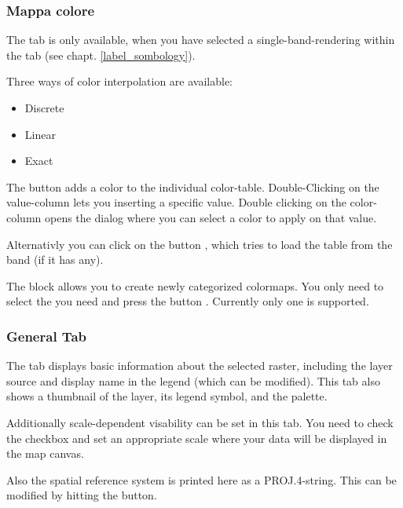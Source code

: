 \subsubsection{Mappa colore} \label{label_colormaptab}

The  tab is only available, when you have selected a
single-band-rendering within the tab  (see chapt. \ref{label_sombology}).

Three ways of color interpolation are available:
\begin{itemize}
\item Discrete
\item Linear 
\item Exact
\end{itemize}

The button  adds a color to the individual color-table.
Double-Clicking on the value-column lets you inserting a specific value.
Double clicking on the color-column opens the dialog  where you can select a color to apply on that value.

Alternativly you can click on the button
, which tries to
load the table from the band (if it has any).

The block  allows you to create newly
categorized colormaps. You only need to select the  you need and press the button . Currently
only one  is
supported.

\subsubsection{General Tab}\label{label_generaltab}

The  tab displays basic information about the selected raster,
including the layer source and  display name in the legend (which can be
modified). This tab also shows a thumbnail of the layer, its legend symbol,
and the palette.

Additionally scale-dependent visability can be set in this tab. You need to
check the checkbox and set an appropriate scale where your data will be
displayed in the map canvas.

Also the spatial reference system is printed here as a PROJ.4-string. 
This can be modified by hitting the  button.

